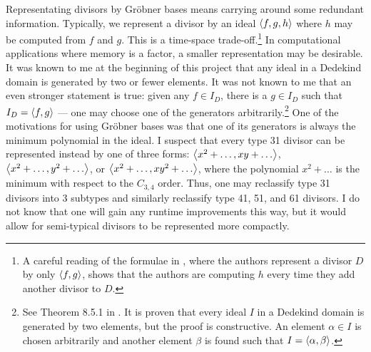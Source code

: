 Representating divisors by Gr\"obner bases means carrying around some redundant information.
Typically, we represent a divisor by an ideal $\left\langle f,g,h \right\rangle$ where $h$ may be computed from $f$ and $g$.
This is a time-space trade-off.\footnote{
A careful reading of the formulae in \cite{salem07}, where the authors represent a divisor $D$ by only $\left\langle f,g \right\rangle$,
shows that the authors are computing $h$ every time they add another divisor to $D$.}
In computational applications where memory is a factor, a smaller representation may be desirable.
It was known to me at the beginning of this project that any ideal in a Dedekind domain is generated by two or fewer elements.
It was not known to me that an even stronger statement is true:
given any $f \in I_D$, there is a $g \in I_D$ such that $I_D = \left\langle f,g \right\rangle$ ---
one may choose one of the generators arbitrarily.\footnote{
See Theorem 8.5.1 in \cite{alaca04}. It is proven that every ideal $I$ in a Dedekind domain is generated by two elements,
but the proof is constructive. An element $\alpha \in I$ is chosen arbitrarily and another element $\beta$ is found
such that $I = \left\langle \alpha, \beta \right\rangle$.}
One of the motivations for using Gr\"obner bases was that one of its generators is always the minimum polynomial in the ideal.
I suspect that every type 31 divisor can be represented instead by one of three forms:
$\left\langle x^2 + \ldots, xy + \ldots \right\rangle$, $\left\langle x^2 + \ldots, y^2 + \ldots \right\rangle$, or $\left\langle x^2 + \ldots, xy^2 + \ldots \right\rangle$,
where the polynomial $x^2 + \ldots$ is the minimum with respect to the $C_{3,4}$ order.
Thus, one may reclassify type 31 divisors into 3 subtypes and similarly reclassify type 41, 51, and 61 divisors.
I do not know that one will gain any runtime improvements this way,
but it would allow for semi-typical divisors to be represented more compactly.

